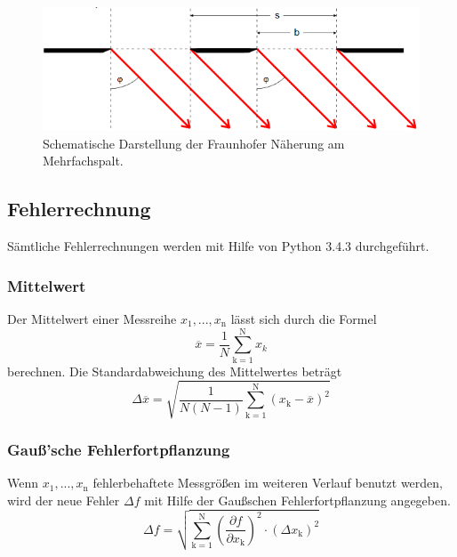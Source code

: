 \begin{figure}[H]
	\includegraphics[width=\linewidth]{Bilder/BeugungAmSpalt.PNG}
	\caption{Schematische Darstellung der Fraunhofer Näherung am Mehrfachspalt. \cite{V406}}
	\label{fig:BeugungAmSpalt}
\end{figure}

\subsection{Fehlerrechnung}
Sämtliche Fehlerrechnungen werden mit Hilfe von Python 3.4.3 durchgeführt.
\subsubsection{Mittelwert}
Der Mittelwert einer Messreihe $x_\text{1}, ... ,x_\text{n}$ lässt sich durch die Formel
\begin{equation}
	\overline{x} = \frac{1}{N} \sum_{\text{k}=1}^\text{N} x_k
	\label{eqn:ave}
\end{equation}
berechnen. Die Standardabweichung des Mittelwertes beträgt
\begin{equation}
	\Delta \overline{x} = \sqrt{ \frac{1}{N(N-1)} \sum_{\text{k}=1}^\text{N} (x_\text{k} - \overline{x})^2}
	\label{eqn:std}
\end{equation}

\subsubsection{Gauß'sche Fehlerfortpflanzung}
Wenn $x_\text{1}, ..., x_\text{n}$ fehlerbehaftete Messgrößen im weiteren Verlauf benutzt werden, wird der neue Fehler $\Delta f$ mit Hilfe der Gaußschen Fehlerfortpflanzung angegeben.
\begin{equation}
	\Delta f = \sqrt{\sum_{\text{k}=1}^\text{N} \left( \frac{ \partial f}{\partial x_\text{k}} \right) ^2 \cdot (\Delta x_\text{k})^2}
	\label{eqn:var}
\end{equation}

